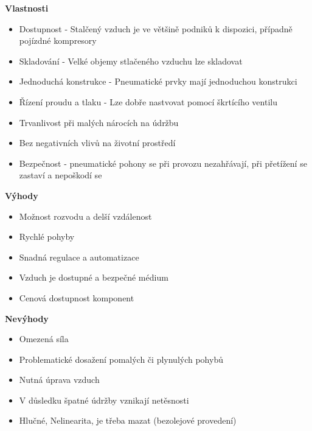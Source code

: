 \textbf{Vlastnosti}
\begin{itemize}
  \item Dostupnost - Stalčený vzduch je ve většině podniků k dispozici, případně pojízdné kompresory
  \item Skladování - Velké objemy stlačeného vzduchu lze skladovat
  \item Jednoduchá konstrukce - Pneumatické prvky mají jednoduchou konstrukci
  \item Řízení proudu a tlaku - Lze dobře nastvovat pomocí škrtícího ventilu
  \item Trvanlivost při malých nárocích na údržbu
  \item Bez negativních vlivů na životní prostředí
  \item Bezpečnost - pneumatické pohony se při provozu nezahřávají, při přetížení se zastaví a nepoškodí se
  \end{itemize}

\textbf{Výhody}
\begin{itemize}
  \item Možnost rozvodu a delší vzdálenost
  \item Rychlé pohyby
  \item Snadná regulace a automatizace
  \item Vzduch je dostupné a bezpečné médium
  \item Cenová dostupnost komponent
\end{itemize}

\textbf{Nevýhody}
\begin{itemize}
  \item Omezená síla
  \item Problematické dosažení pomalých či plynulých pohybů
  \item Nutná úprava vzduch
  \item V důsledku špatné údržby vznikají netěsnosti
  \item Hlučné, Nelinearita, je třeba mazat (bezolejové provedení)
\end{itemize}

